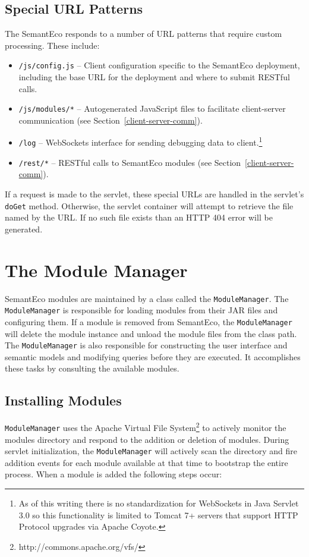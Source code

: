 \documentclass[letterpaper]{report}
\begin{document}
\subsection{Special URL Patterns}
\label{url-patterns}
The SemantEco responds to a number of URL patterns that require custom processing. These include:
\begin{itemize}
\item \texttt{/js/config.js} -- Client configuration specific to the SemantEco deployment, including the base URL for the deployment and where to submit RESTful calls.
\item \texttt{/js/modules/*} -- Autogenerated JavaScript files to facilitate client-server communication (see Section~\ref{client-server-comm}).
\item \texttt{/log} -- WebSockets interface for sending debugging data to client.\footnote{As of this writing there is no standardization for WebSockets in Java Servlet 3.0 so this functionality is limited to Tomcat 7+ servers that support HTTP Protocol upgrades via Apache Coyote.}
\item \texttt{/rest/*} -- RESTful calls to SemantEco modules (see Section~\ref{client-server-comm}).
\end{itemize}

\noindent If a request is made to the servlet, these special URLs are handled in the servlet's \texttt{doGet} method. Otherwise, the servlet container will attempt to retrieve the file named by the URL. If no such file exists than an HTTP 404 error will be generated.

\section{The Module Manager}
\label{module-manager}
SemantEco modules are maintained by a class called the \texttt{ModuleManager}. The \texttt{ModuleManager} is responsible for loading modules from their JAR files and configuring them. If a module is removed from SemantEco, the \texttt{ModuleManager} will delete the module instance and unload the module files from the class path. The \texttt{ModuleManager} is also responsible for constructing the user interface and semantic models and modifying queries before they are executed. It accomplishes these tasks by consulting the available modules.

\subsection{Installing Modules}
\label{installing-modules}
\texttt{ModuleManager} uses the Apache Virtual File System\footnote{http://commons.apache.org/vfs/} to actively monitor the modules directory and respond to the addition or deletion of modules. During servlet initialization, the \texttt{ModuleManager} will actively scan the directory and fire addition events for each module available at that time to bootstrap the entire process. When a module is added the following steps occur:
\end{document}
